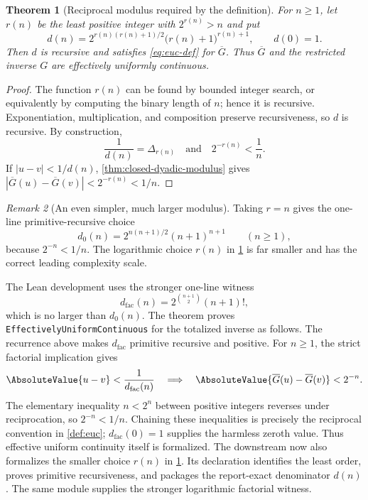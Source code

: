 \documentclass[11pt,oneside]{article}
\newtheorem{theorem}{Theorem}[section]
\theoremstyle{definition}
\theoremstyle{remark}
\newtheorem{remark}[theorem]{Remark}
\numberwithin{equation}{section}
\newcommand{\InvT}{\overline G}
\begin{document}
\begin{theorem}[Reciprocal modulus required by the definition]\label{thm:reciprocal-modulus}
For $n\ge1$, let $r(n)$ be the least positive integer with $2^{r(n)}>n$ and
put
\begin{equation}\label{eq:d-explicit}
 d(n)=2^{r(n)(r(n)+1)/2}\bigl(r(n)+1\bigr)^{r(n)+1},
 \qquad d(0)=1.
\end{equation}
Then $d$ is recursive and satisfies \eqref{eq:euc-def} for $\InvT$.
Thus $\InvT$ and the restricted inverse $G$ are effectively uniformly
continuous.
\end{theorem}

\begin{proof}
The function $r(n)$ can be found by bounded integer search, or equivalently by
computing the binary length of $n$; hence it is recursive.  Exponentiation,
multiplication, and composition preserve recursiveness, so $d$ is recursive.
By construction,
\[
 \frac1{d(n)}=\Delta_{r(n)}
 \quad\text{and}\quad
 2^{-r(n)}<\frac1n.
\]
If $|u-v|<1/d(n)$, \cref{thm:closed-dyadic-modulus} gives
$|\InvT(u)-\InvT(v)|<2^{-r(n)}<1/n$.
\end{proof}

\begin{remark}[An even simpler, much larger modulus]
Taking $r=n$ gives the one-line primitive-recursive choice
\[
 d_0(n)=2^{n(n+1)/2}(n+1)^{n+1}\qquad(n\ge1),
\]
because $2^{-n}<1/n$.  The logarithmic choice $r(n)$ in
\cref{thm:reciprocal-modulus} is far smaller and has the correct leading
complexity scale.

The Lean development uses the stronger one-line witness
\[
 d_{\mathrm{fac}}(n)=2^{\binom{n+1}{2}}(n+1)!,
\]
which is no larger than $d_0(n)$.  The theorem
 proves
\texttt{EffectivelyUniformContinuous} for the totalized inverse as follows.
The recurrence above makes $d_{\mathrm{fac}}$ primitive recursive and positive.
For $n\ge1$, the strict factorial implication gives
\[
 \AbsoluteValue{u-v}<\frac1{d_{\mathrm{fac}}(n)}
 \quad\Longrightarrow\quad
 \AbsoluteValue{\InvT(u)-\InvT(v)}<2^{-n}.
\]
The elementary inequality $n<2^n$ between positive integers reverses under
reciprocation, so $2^{-n}<1/n$.  Chaining these inequalities is precisely the
reciprocal convention in \cref{def:euc}; $d_{\mathrm{fac}}(0)=1$ supplies the
harmless zeroth value.  Thus effective uniform continuity itself is
formalized.  The downstream
 now also formalizes the smaller
choice $r(n)$ in \cref{thm:reciprocal-modulus}.  Its declaration
 identifies the least order,
 proves primitive
recursiveness, and
 packages
the report-exact denominator $d(n)$.  The same module supplies the stronger
logarithmic factorial witness.
\end{remark}
\end{document}
